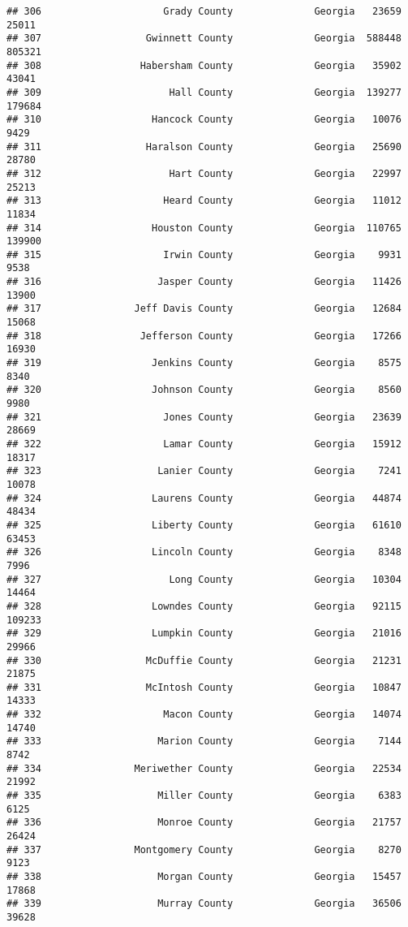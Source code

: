 \documentclass[
]{article}
\begin{document}
\begin{verbatim}
## 306                     Grady County              Georgia   23659   25011
## 307                  Gwinnett County              Georgia  588448  805321
## 308                 Habersham County              Georgia   35902   43041
## 309                      Hall County              Georgia  139277  179684
## 310                   Hancock County              Georgia   10076    9429
## 311                  Haralson County              Georgia   25690   28780
## 312                      Hart County              Georgia   22997   25213
## 313                     Heard County              Georgia   11012   11834
## 314                   Houston County              Georgia  110765  139900
## 315                     Irwin County              Georgia    9931    9538
## 316                    Jasper County              Georgia   11426   13900
## 317                Jeff Davis County              Georgia   12684   15068
## 318                 Jefferson County              Georgia   17266   16930
## 319                   Jenkins County              Georgia    8575    8340
## 320                   Johnson County              Georgia    8560    9980
## 321                     Jones County              Georgia   23639   28669
## 322                     Lamar County              Georgia   15912   18317
## 323                    Lanier County              Georgia    7241   10078
## 324                   Laurens County              Georgia   44874   48434
## 325                   Liberty County              Georgia   61610   63453
## 326                   Lincoln County              Georgia    8348    7996
## 327                      Long County              Georgia   10304   14464
## 328                   Lowndes County              Georgia   92115  109233
## 329                   Lumpkin County              Georgia   21016   29966
## 330                  McDuffie County              Georgia   21231   21875
## 331                  McIntosh County              Georgia   10847   14333
## 332                     Macon County              Georgia   14074   14740
## 333                    Marion County              Georgia    7144    8742
## 334                Meriwether County              Georgia   22534   21992
## 335                    Miller County              Georgia    6383    6125
## 336                    Monroe County              Georgia   21757   26424
## 337                Montgomery County              Georgia    8270    9123
## 338                    Morgan County              Georgia   15457   17868
## 339                    Murray County              Georgia   36506   39628

\end{verbatim}
\end{document}
